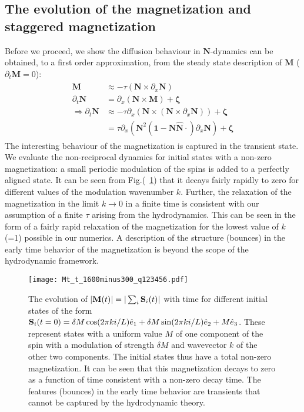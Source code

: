 \documentclass[prl,aps,twocolumn,nosuperscriptaddress,bibnotes,notitlepage,nofootinbib]{revtex4-2}
\newcommand{\magg}{\mathbf{M}}
\newcommand{\stagg}{\mathbf{N}}
\begin{document}
\subsection*{The evolution of the magnetization and staggered magnetization}
Before we proceed, we show the diffusion behaviour in $\stagg$-dynamics can be obtained, to a first order approximation, from the steady state description of $\magg $ ($\partial_t \magg = 0$):
\begin{align}
    \begin{split}
    \magg & \approx -\tau (\stagg \times \partial_x \stagg) \\
    \partial_t \stagg &= \partial_x(\stagg \times \magg) + \mathbf{\zeta}\\
\Rightarrow \partial_t \stagg  &\approx -\tau \partial_x (\stagg \times (\stagg \times \partial_x \stagg)) + \boldsymbol{\zeta}  \\
    &= \tau \partial_x (\stagg^2(\mathbf{1} - \hat{\stagg}\hat{\stagg} \cdot ) \partial_x \stagg) + \boldsymbol{\zeta }
    \end{split}
    \label{eqn:Diffeqn_stagg}
\end{align}
The interesting behaviour of the magnetization is captured in the transient state. We evaluate the non-reciprocal dynamics for initial states with a non-zero magnetization: a small periodic modulation of the spins is added to a perfectly aligned state. It can be seen from Fig.(~\ref{fig:Mkt_decayvs_t}) that it decays fairly rapidly to zero for different values of the modulation wavenumber $k$. Further, the relaxation of the magnetization in the limit $k \rightarrow 0$ in a finite time is consistent with our assumption of a finite $\tau$ arising from the hydrodynamics. This can be seen in the form of a fairly rapid relaxation of the magnetization for the lowest value of $k$ (=1) possible in our numerics. A description of the structure (bounces) in the early time behavior of the magnetization is beyond the scope of the hydrodynamic framework.\\


\begin{figure}[H]
\centering
\texttt{[image: Mt\_t\_1600minus300\_q123456.pdf]}
\caption{\small The evolution of $|\magg(t)| = |\sum_i {\bf S}_i(t)|$ with time for different initial states of the form ${\bf S}_i(t=0) = \delta M \cos(2 \pi k i/L) \hat{e}_1 + \delta M \sin(2 \pi k i/L) \hat{e}_2 + M \hat{e}_3$. These represent states with a uniform value $M$ of one component of the spin with a modulation of strength $\delta M$ and wavevector $k$ of the other two components. The initial states thus have a total non-zero magnetization. It can be seen that this magnetization decays to zero as a function of time consistent with a non-zero decay time. The features (bounces) in the early time behavior are transients that cannot be captured by the hydrodynamic theory.}
\label{fig:Mkt_decayvs_t}
\end{figure}
\end{document}
